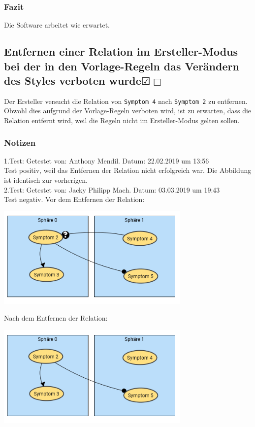 \documentclass[enabledeprecatedfontcommands]{scrartcl}
\newcommand{\subsectiont}[2]{\subsection[#1]{#1{\normalsize\normalfont #2}}}
\newcommand{\leer}{$\Box$}
\newcommand{\ok}{$\CheckedBox$}
\begin{document}
\subsubsection{Fazit}
Die Software arbeitet wie erwartet.

\subsectiont{Entfernen einer Relation im Ersteller-Modus bei der in den Vorlage-Regeln das Verändern des Styles verboten wurde}{\dotfill\XBox\ok\leer}
Der Ersteller versucht die Relation von \texttt{Symptom 4} nach \texttt{Symptom 2} zu entfernen. Obwohl dies aufgrund der Vorlage-Regeln verboten wird, ist zu erwarten, dass die Relation entfernt wird, weil die Regeln nicht im Ersteller-Modus gelten sollen.
\subsubsection{Notizen}
1.Test: Getestet von: Anthony Mendil. Datum: 22.02.2019 um 13:56 \\
Test positiv, weil das Entfernen der Relation nicht erfolgreich war. Die Abbildung ist identisch zur vorherigen. \\ 
2.Test: Getestet von: Jacky Philipp Mach. Datum: 03.03.2019 um 19:43 \\
Test negativ. 
\newpage
Vor dem Entfernen der Relation:
\begin{center}
\includegraphics[height=5cm]{1_15vorher.png}
\end{center}
Nach dem Entfernen der Relation:
\begin{center}
\includegraphics[height=5cm]{1_15nachher.png}
\end{center}
\end{document}
